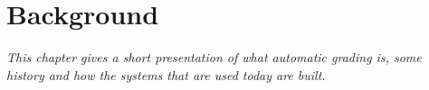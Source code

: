 \chapter{Background}

\textit{This chapter gives a short presentation of what automatic grading is, some history and how the systems that are used today are built.}






